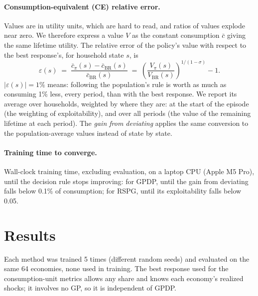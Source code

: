\documentclass[11pt,a4paper]{article}
\begin{document}
\paragraph{Consumption-equivalent (CE) relative error.} Values are in utility units, which are hard
to read, and ratios of values explode near zero. We therefore express a value $V$ as the constant
consumption $\bar c$ giving the same lifetime utility. The relative error of the policy's value with
respect to the best response's, for household state $s$, is
\[
\varepsilon(s) \;=\; \frac{\bar c_{\pi}(s) - \bar c_{\mathrm{BR}}(s)}{\bar c_{\mathrm{BR}}(s)}
\;=\; \left(\frac{V_\pi(s)}{V_{\mathrm{BR}}(s)}\right)^{1/(1-\sigma)} - 1 .
\]
$|\varepsilon(s)| = 1\%$ means: following the population's rule is worth as much as consuming 1\%
less, every period, than with the best response. We report its average over households, weighted by
where they are: at the start of the episode (the weighting of exploitability), and over all periods
(the value of the remaining lifetime at each period). The \emph{gain from deviating} applies the same
conversion to the population-average values instead of state by state.

\paragraph{Training time to converge.} Wall-clock training time, excluding evaluation, on a laptop
CPU (Apple M5 Pro), until the decision rule stops improving: for GPDP, until the gain from deviating
falls below 0.1\% of consumption; for RSPG, until its exploitability falls below 0.05.

\section{Results}\label{sec:results}

Each method was trained 5 times (different random seeds) and evaluated on the same 64 economies,
none used in training. The best response used for the consumption-unit metrics allows any share and
knows each economy's realized shocks; it involves no GP, so it is independent of GPDP.
\end{document}
